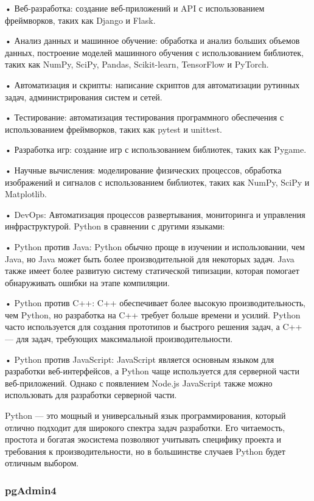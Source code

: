•	Веб-разработка: создание веб-приложений и API с использованием фреймворков, таких как Django и Flask.

•	Анализ данных и машинное обучение: обработка и анализ больших объемов данных, построение моделей машинного обучения с использованием библиотек, таких как NumPy, SciPy, Pandas, Scikit-learn, TensorFlow и PyTorch.

•	Автоматизация и скрипты: написание скриптов для автоматизации рутинных задач, администрирования систем и сетей.

•	Тестирование: автоматизация тестирования программного обеспечения с использованием фреймворков, таких как pytest и unittest.

•	Разработка игр: создание игр с использованием библиотек, таких как Pygame.

•	Научные вычисления: моделирование физических процессов, обработка изображений и сигналов с использованием библиотек, таких как NumPy, SciPy и Matplotlib.

•	DevOps: Автоматизация процессов развертывания, мониторинга и управления инфраструктурой.
Python в сравнении с другими языками:

•	Python против Java: Python обычно проще в изучении и использовании, чем Java, но Java может быть более производительной для некоторых задач. Java также имеет более развитую систему статической типизации, которая помогает обнаруживать ошибки на этапе компиляции.

•	Python против C++: C++ обеспечивает более высокую производительность, чем Python, но разработка на C++ требует больше времени и усилий. Python часто используется для создания прототипов и быстрого решения задач, а C++ — для задач, требующих максимальной производительности.

•	Python против JavaScript: JavaScript является основным языком для разработки веб-интерфейсов, а Python чаще используется для серверной части веб-приложений. Однако с появлением Node.js JavaScript также можно использовать для разработки серверной части.

Python — это мощный и универсальный язык программирования, который отлично подходит для широкого спектра задач разработки. Его читаемость, простота и богатая экосистема позволяют учитывать специфику проекта и требования к производительности, но в большинстве случаев Python будет отличным выбором.

\subsubsection{pgAdmin4}

